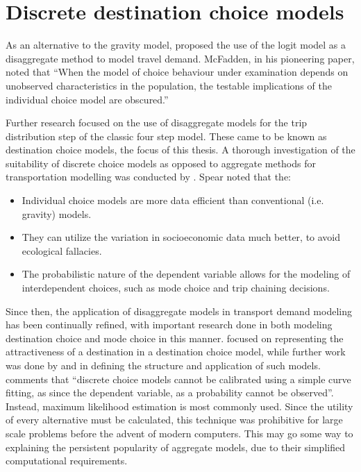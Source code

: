 \section{Discrete destination choice models}
As an alternative to the gravity model, \textcite{McFadden73, Akiva74} proposed the use of the logit model as a disaggregate method to model travel demand. McFadden, in his pioneering paper, noted that \enquote{When the model of choice behaviour under examination depends on unobserved characteristics in the population, the testable implications of the individual choice model are obscured.}\parencite{McFadden73}

Further research focused on the use of disaggregate models for the trip distribution step of the classic four step model. These came to be known as destination choice models, the focus of this thesis. A thorough investigation of the suitability of discrete choice models as opposed to aggregate methods for transportation modelling was conducted by \textcite{Spear77}. Spear noted that the:
\begin{itemize}
\item Individual choice models are more data efficient than conventional (i.e. gravity) models.
\item They can utilize the variation in socioeconomic data much better, to avoid ecological fallacies.
\item The probabilistic nature of the dependent variable allows for the modeling of interdependent choices, such as mode choice and trip chaining decisions. 
\end{itemize}
	
Since then, the application of disaggregate models in transport demand modeling has been continually refined, with important research done in both modeling destination choice and mode choice in this manner. \textcite{Daly82} focused on representing the attractiveness of a destination in a destination choice model, while further work was done by \textcite{Akiva74} and \textcite{Anas81} in defining the structure and application of such models. \textcite{Train09} comments that \enquote{discrete choice models cannot be calibrated using a simple curve fitting, as since the dependent variable, as a probability cannot be observed}. Instead, maximum likelihood estimation is most commonly used. Since the utility of every alternative must be calculated, this technique was prohibitive for large scale problems before the advent of modern computers. This may go some way to explaining the persistent popularity of aggregate models, due to their simplified computational requirements.


